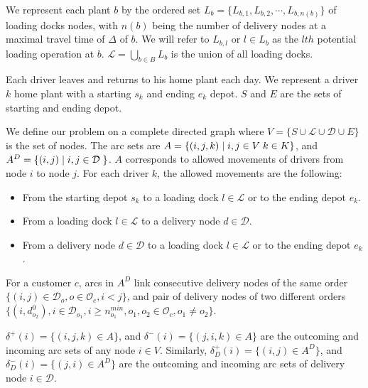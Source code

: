 \documentclass{article}
\begin{document}
We represent each plant $b$ by the ordered set $L_b=\{L_{b,1}, L_{b,2},\cdots, L_{b,n(b)}\}$ of loading docks nodes, with $n(b)$ being the number of delivery nodes at a maximal travel time of $\Delta$ of $b$. We will refer to $L_{b,l}$ or  $l \in L_b$  as the $lth$ potential loading operation at $b$. $\mathcal{L}=\bigcup_{b\in B} L_b$ is the union of all loading docks. 

Each driver leaves and returns to his home plant each day. We represent a driver $k$ home plant with a starting $s_k$ and ending $e_k$ depot. $S$ and $E$ are the sets of starting and ending depot.

We define our problem on a complete directed graph where $V=\{ S \cup \mathcal{L} \cup \mathcal{D} \cup E\}$ is the set of nodes. The arc sets are $A =  \{(i,j,k) \hspace*{1mm} \vert \hspace*{1mm} i, j \in V \hspace{1mm} k\in K \}$, and $A^D = \{(i,j) \hspace*{1mm} \vert \hspace*{1mm} i, j \in \mathcal{D} \hspace{1mm} \}$. 
$A$ corresponds to allowed movements of drivers from node $i$ to node $j$. For each driver $k$, the allowed movements are the following:
\begin{itemize}
    \item From the starting depot $s_k$ to a loading dock $l \in \mathcal{L}$ or to the ending depot $e_k$.
    \item From a loading dock $l \in \mathcal{L}$ to a delivery node $d \in \mathcal{D}$.
    \item From a delivery node  $d \in \mathcal{D}$ to a loading dock $l \in \mathcal{L}$ or to the ending depot $e_k$.
\end{itemize}

For a customer $c$, arcs in $A^D$ link consecutive delivery nodes of the same order   $\lbrace (i,j)\in \mathcal{D}_o, o \in \mathcal{O}_c, i < j  \rbrace$, and pair of delivery nodes of two different orders $ \lbrace (i,d^{0}_{o_2}),  i \in \mathcal{D}_{o_1}, i \geq n^{min}_{o_1}, o_1, o_2 \in \mathcal{O}_c, o_1 \neq o_2 \rbrace $.

$\delta^{+}(i) = \{(i, j,k) \in A \}$, and $\delta^{-}(i) = \{(j, i,k) \in A \}$ are the outcoming and incoming arc sets of any node $i \in V$. Similarly, $\delta^{+}_D(i) = \{(i, j)  \in A^D\}$, and $\delta^{-}_D(i) = \{(j, i) \in A^D \}$ are the outcoming and incoming arc sets of delivery node $i \in \mathcal{D}$.
\end{document}
